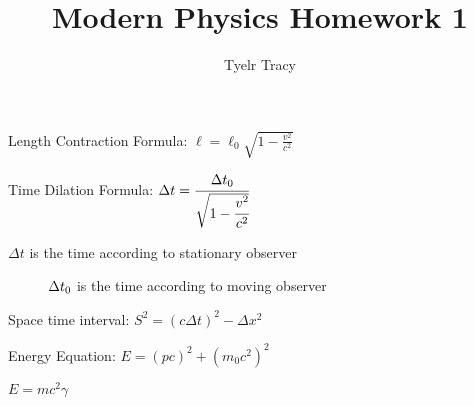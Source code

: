 \documentclass{article}
\title{Modern Physics Homework 1}
\author{Tyelr Tracy}
\begin{document}
Length Contraction Formula: $\ell = \ell_0 \sqrt{1 - \frac{v^2}{c^2}}$

Time Dilation Formula: $\Delta t = \cfrac{\Delta t_0}{\sqrt{1-\cfrac{v^2}{c^2}}}$

\hspace*{10mm} $\Delta t$ is the time according to stationary observer

$\hspace*{10mm} \Delta t_0$ is the time according to moving observer




Space time interval: $S^2 =  (c \Delta t)^2 - \Delta x^2 $


Energy Equation:
$E = (pc)^2 + (m_0c^2)^2$

$E = mc^2\gamma$
\end{document}

